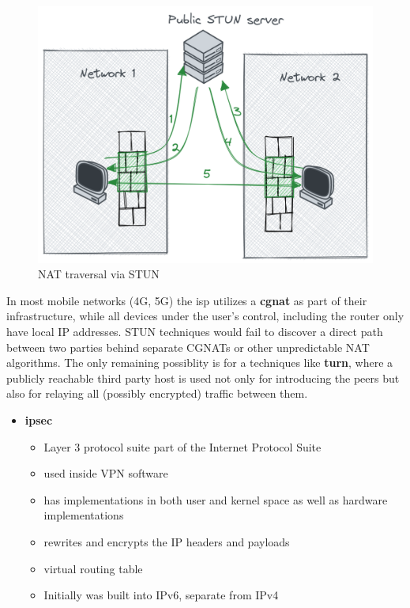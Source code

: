 \begin{figure}
\centering
\includegraphics[width=\textwidth,height=0.25\textheight]{thesis/../figures/nat-traversal.png}
\caption{NAT traversal via STUN\label{nat-traversal}}
\end{figure}

In most mobile networks (4G, 5G) the \gls{isp} utilizes a
\textbf{\gls{cgnat}} as part of their infrastructure, while all devices
under the user's control, including the router only have local IP
addresses. STUN techniques would fail to discover a direct path between
two parties behind separate CGNATs or other unpredictable NAT
algorithms. The only remaining possiblity is for a techniques like
\textbf{\acrfull{turn}}, where a publicly reachable third party host is
used not only for introducing the peers but also for relaying all
(possibly encrypted) traffic between them.

\begin{itemize}
\tightlist
\item
  \textbf{\acrfull{ipsec}}

  \begin{itemize}
  \tightlist
  \item
    Layer 3 protocol suite part of the Internet Protocol Suite
  \item
    used inside VPN software
  \item
    has implementations in both user and kernel space as well as
    hardware implementations
  \item
    rewrites and encrypts the IP headers and payloads
  \item
    virtual routing table
  \item
    Initially was built into IPv6, separate from IPv4
  \end{itemize}
\end{itemize}

